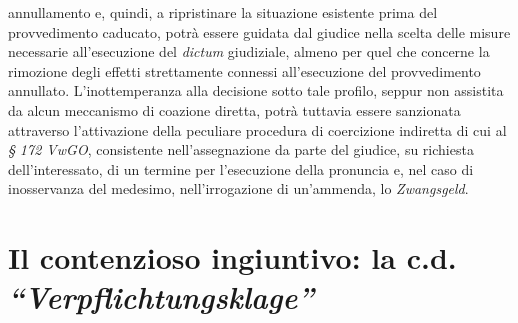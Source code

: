 \documentclass[12pt,it,a4paper,]{report}
\begin{document}
annullamento e, quindi, a ripristinare la situazione esistente prima del
provvedimento caducato, potrà essere guidata dal giudice nella scelta
delle misure necessarie all'esecuzione del \emph{dictum} giudiziale,
almeno per quel che concerne la rimozione degli effetti strettamente
connessi all'esecuzione del provvedimento annullato. L'inottemperanza
alla decisione sotto tale profilo, seppur non assistita da alcun
meccanismo di coazione diretta, potrà tuttavia essere sanzionata
attraverso l'attivazione della peculiare procedura di coercizione
indiretta di cui al \emph{§ 172 VwGO}, consistente nell'assegnazione da
parte del giudice, su richiesta dell'interessato, di un termine per
l'esecuzione della pronuncia e, nel caso di inosservanza del medesimo,
nell'irrogazione di un'ammenda, lo \emph{Zwangsgeld}.

\hypertarget{il-contenzioso-ingiuntivo-la-c.d.-verpflichtungsklage}{%
\section{\texorpdfstring{Il contenzioso ingiuntivo: la c.d.
\emph{``Verpflichtungsklage''}}{Il contenzioso ingiuntivo: la c.d. ``Verpflichtungsklage''}}\label{il-contenzioso-ingiuntivo-la-c.d.-verpflichtungsklage}}
\end{document}
